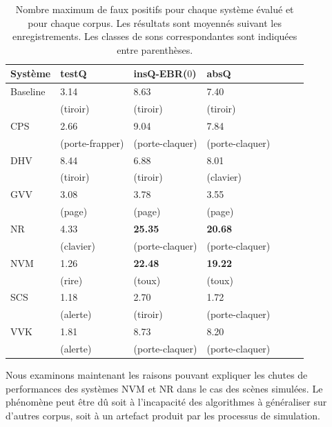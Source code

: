 \begin{table}[t]
\begin{center} 
\begin{tabular}{lllllll}  
  Système &   testQ         &  insQ-EBR($0$)      &   absQ          \\
 \hline
 Baseline & 3.14            &  8.63             &  7.40    \\
          & (tiroir)        &  (tiroir)         & (tiroir) \\
      CPS & 2.66            &  9.04             &  7.84   \\
          & (porte-frapper) & (porte-claquer)   & (porte-claquer) \\
      DHV & 8.44            &  6.88             &  8.01  \\
          & (tiroir)        &  (tiroir)         &  (clavier)  \\
      GVV & 3.08            &  3.78             &  3.55   \\
          & (page)          &  (page)           & (page) \\
      NR  & 4.33            & \textbf{25.35}    & \textbf{20.68}  \\
          & (clavier)       & (porte-claquer)   & (porte-claquer)  \\
      NVM & 1.26            & \textbf{22.48}    & \textbf{19.22}    \\
          & (rire)          & (toux)            & (toux) \\
      SCS & 1.18            &  2.70             &  1.72   \\
          & (alerte)        &  (tiroir)         & (porte-claquer)  \\
      VVK & 1.81            &  8.73             &  8.20   \\ 
          & (alerte)        &  (porte-claquer)  & (porte-claquer) \\
       \hline
\end{tabular}
\end{center} 
\caption[Nombre maximum de faux positifs pour chaque système évalué et pour chaque corpus]{Nombre maximum de faux positifs pour chaque système évalué et pour chaque corpus. Les résultats sont moyennés suivant les enregistrements. Les classes de sons correspondantes sont indiquées entre parenthèses.}
\label{tab:fp}
\end{table}

Nous examinons maintenant les raisons pouvant expliquer les chutes de performances des systèmes NVM et NR dans le cas des scènes simulées. Le phénomène peut être dû soit à l'incapacité des algorithmes à généraliser sur d'autres corpus, soit à un artefact produit par les processus de simulation.

